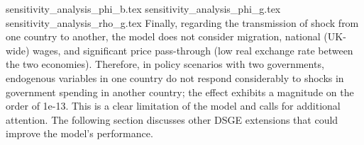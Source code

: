 \newpage
{sensitivity_analysis_phi_b.tex}
\newpage
{sensitivity_analysis_phi_g.tex}
\newpage
{sensitivity_analysis_rho_g.tex}
Finally, regarding the transmission of shock from one country to another, the model does not consider migration, national (UK-wide) wages, and significant price pass-through (low real exchange rate between the two economies). Therefore, in policy scenarios with two governments, endogenous variables in one country do not respond considerably to shocks in government spending in another country; the effect exhibits a magnitude on the order of 1e-13. This is a clear limitation of the model and calls for additional attention. The following section discusses other DSGE extensions that could improve the model's performance.
